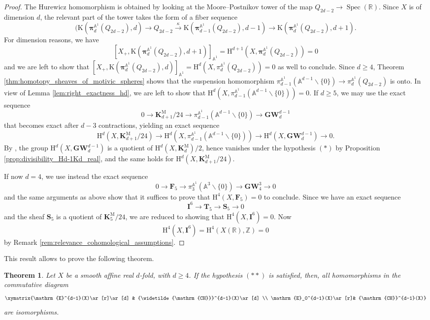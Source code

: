 \documentclass[11pt,leqno]{amsart}
\newcommand{\Spec}{\operatorname{Spec}}
\newcommand{\GW}{\mathbf{GW}}
\newcommand{\real}{{\mathbb R}}
\newcommand{\Z}{{\mathbb Z}}
\newcommand{\aone}{{\mathbb A}^1}
\renewcommand{\1}{{\rm 1\hspace*{-0.4ex}%
\rule{0.1ex}{1.52ex}\hspace*{0.2ex}}}
\newcommand{\bpi}{\bm{\pi}}
\newcommand{\piaone}{{\bpi}^{\aone}}
\newcommand{\CHW}{{\widetilde{\mathrm{CH}}}}
\newcommand{\CH}{{\mathrm{CH}}}
\newcommand{\Hr}{{\mathrm {H}}}
\newcommand{\<}[1]{{\langle}#1 {\rangle}}
\newcommand{\Ibf}{\mathbf{I}}
\newcommand{\Rb}{\mathbb{R}}
\newcommand{\Kbf}{\mathbf{K}}
\newcommand{\Er}{\mathrm{E}}
\newcommand{\Abb}{\mathbb{A}}
\newcommand{\Mr}{\mathrm{M}}
\newcommand{\Tbf}{\mathbf{T}}
\newcommand{\Sbf}{\mathbf{S}}
\newcommand{\Fbf}{\mathbf{F}}
\theoremstyle{plain}
\newtheorem{thm}{Theorem}[section]
\theoremstyle{definition}
\theoremstyle{remark}
\numberwithin{equation}{section}
\begin{document}
\begin{proof}
The Hurewicz homomorphism is obtained by looking at the Moore--Postnikov tower of the map $Q_{2d-2}\to \Spec(\real)$. Since $X$ is of dimension $d$, the relevant part of the tower takes the form of a fiber sequence 
\[
(\mathrm{K}(\piaone_{d}(Q_{2d-2}),d)\to Q_{2d-2}\xrightarrow{\kappa}\mathrm{K}(\piaone_{d-1}(Q_{2d-2}),d-1)\to \mathrm{K}(\piaone_{d}(Q_{2d-2}),d+1).
\]
For dimension reasons, we have
\[
[X_+,\mathrm{K}(\piaone_{d}(Q_{2d-2}),d+1)]_{\aone}=\Hr^{d+1}(X,\piaone_{d}(Q_{2d-2}))=0
\]
and we are left to show that $[X_+,\mathrm{K}(\piaone_{d}(Q_{2d-2}),d)]_{\aone}=\Hr^d(X,\pi_{d}^{\Abb^1}(Q_{2d-2}))=0$ as well to conclude. Since $d\geq 4$, Theorem \ref{thm:homotopy_sheaves_of_motivic_spheres} shows that the suspension homomorphism $\pi_{d-1}^{\Abb^1}(\Abb^{d-1}\smallsetminus\{0\})\to \pi_{d}^{\Abb^1}(Q_{2d-2})$ is onto. In view of Lemma \ref{lem:right_exactness_hd}, we are left to show that $\Hr^d(X,\pi_{d-1}^{\Abb^1}(\Abb^{d-1}\smallsetminus\{0\}))=0$. If $d\geq 5$, we may use the exact sequence
\[
0\rightarrow\Kbf_{d+1}^\Mr/24\rightarrow\pi_{d-1}^{\Abb^1}(\Abb^{d-1}\smallsetminus \{0\})\rightarrow\GW_{d}^{d-1}
\]
that becomes exact after $d-3$ contractions, yielding an exact sequence
\[
\Hr^d(X,\Kbf_{d+1}^\Mr/24)\to \Hr^d(X,\pi_{d-1}^{\Abb^1}(\Abb^{d-1}\smallsetminus \{0\})) \to \Hr^d(X,\GW_{d}^{d-1})\to 0.
\]
By \cite[Theorem 3.7.1]{asokSplittingVectorBundles2014}, the group $\Hr^d(X,\GW_{d}^{d-1})$ is a quotient of $\Hr^d(X,\Kbf_d^\Mr)/2$, hence vanishes under the hypothesis $(*)$ by Proposition \ref{prop:divisibility_Hd-1Kd_real}, and the same holds for $\Hr^d(X,\Kbf_{d+1}^\Mr/24)$.

If now $d=4$, we use instead the exact sequence
\[
 0\to\Fbf_5\rightarrow\pi_3^{\Abb^1}(\Abb^3\smallsetminus \{0\})\to\GW_4^3\to 0
\] 
and the same arguments as above show that it suffices to prove that $\Hr^4(X,\Fbf_5)=0$ to conclude. Since we have an exact sequence  \[\Ibf^6\rightarrow\Tbf_5\rightarrow\Sbf_5\rightarrow 0\] and the sheaf $\Sbf_5$ is a quotient of $\Kbf_5^\Mr/24$, we are reduced to showing that $\Hr^4(X,\Ibf^6)=0$. Now
\[
\Hr^4(X,\Ibf^6)=\Hr^4(X(\Rb),\Z)=0
\] 
by Remark \ref{rem:relevance_cohomological_assumptions}.
\end{proof}

This result allows to prove the following theorem.

\begin{thm}
Let $X$ be a smooth affine real $d$-fold, with $d\geq 4$. If the hypothesis $(**)$ is satisfied, then, all homomorphisms in the commutative diagram
\[
\xymatrix{\Er^{d-1}(X)\ar[r]\ar[d] & \CHW^{d-1}(X)\ar[d] \\
\Er_0^{d-1}(X)\ar[r]& \CH^{d-1}(X)}
\]
are isomorphisms.
\end{thm}
\end{document}
